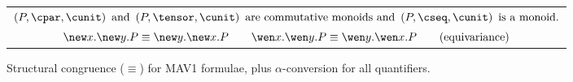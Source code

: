 \documentclass[UKenglish,acmsmall,authorversion]{acmart}
\theoremstyle{plain}
\begin{document}
\begin{figure}[t]
\begin{tabular}{c}
$\left(P, \cpar, \cunit\right)\mbox{ and }\left(P, \tensor, \cunit\right)\mbox{ are commutative monoids}
\mbox{ and }
\left(P, \cseq, \cunit\right)\mbox{ is a monoid.}$
\\[9pt]
$\new x .\new y. P \equiv \new y .\new x. P
\qquad
\wen x .\wen y .P \equiv \wen y .\wen x .P
\qquad\mbox{(equivariance)}$
\end{tabular}
\caption{Structural congruence ($\equiv$)
 for \textsf{MAV1} formulae,
plus $\alpha$-conversion for all quantifiers.
}\label{figure:congruence}
\end{figure}
\end{document}
